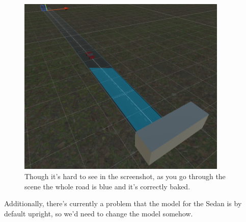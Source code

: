 \begin{figure}[!ht]
    \centering
    \includegraphics[width=10cm]{../Images/Update3/CorrectMesh.png}
       \caption{Though it's hard to see in the screenshot, as you go through the scene the whole road is blue and it's correctly baked.}
           \label{Fig: Bake Mesh Settings}
   \end{figure}

\begin{flushleft}
Additionally, there's currently a problem that the model for the Sedan is by default upright, so we'd need to change the model somehow. 
\end{flushleft}